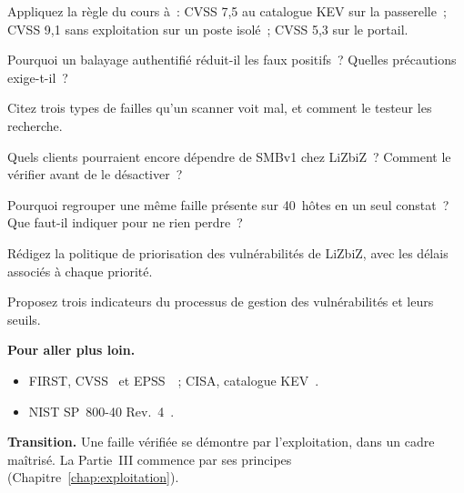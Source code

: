 \begin{boxexo}[title={\ding{45}\quad Exercice~7.4. Prioriser \niveaumoyen}]
Appliquez la règle du cours à~: CVSS 7,5 au catalogue KEV sur la
passerelle~; CVSS 9,1 sans exploitation sur un poste isolé~; CVSS 5,3 sur le
portail.
\end{boxexo}

\begin{boxexo}[title={\ding{45}\quad Exercice~7.5. Authentifié \niveaumoyen}]
Pourquoi un balayage authentifié réduit-il les faux positifs~? Quelles
précautions exige-t-il~?
\end{boxexo}

\begin{boxexo}[title={\ding{45}\quad Exercice~7.6. Faux négatifs \niveaumoyen}]
Citez trois types de failles qu'un scanner voit mal, et comment le testeur
les recherche.
\end{boxexo}

\begin{boxexo}[title={\ding{45}\quad Exercice~7.7. T-06 \niveaumoyen}]
Quels clients pourraient encore dépendre de SMBv1 chez LiZbiZ~? Comment le
vérifier avant de le désactiver~?
\end{boxexo}

\begin{boxexo}[title={\ding{45}\quad Exercice~7.8. Regrouper \niveaumoyen}]
Pourquoi regrouper une même faille présente sur 40~hôtes en un seul
constat~? Que faut-il indiquer pour ne rien perdre~?
\end{boxexo}

\begin{boxexo}[title={\ding{45}\quad Exercice~7.9. Une politique \niveauexpert}]
Rédigez la politique de priorisation des vulnérabilités de LiZbiZ, avec les
délais associés à chaque priorité.
\end{boxexo}

\begin{boxexo}[title={\ding{45}\quad Exercice~7.10. Mesurer \niveauexpert}]
Proposez trois indicateurs du processus de gestion des vulnérabilités et
leurs seuils.
\end{boxexo}

\bigskip

\begin{boxinfo}
\textbf{Pour aller plus loin.}
\begin{itemize}
    \item FIRST, CVSS~\cite{first2019cvss31} et EPSS~\cite{firstepss}~;
          CISA, catalogue KEV~\cite{cisakev}.
    \item NIST SP~800-40 Rev.~4~\cite{nist80040}.
\end{itemize}
\end{boxinfo}

\begin{boxinfo}
\textbf{Transition.} Une faille vérifiée se démontre par l'exploitation,
dans un cadre maîtrisé. La Partie~III commence par ses principes
(Chapitre~\ref{chap:exploitation}).
\end{boxinfo}
